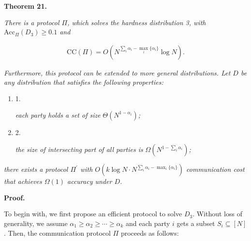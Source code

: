 

\par\medskip\noindent\textbf{
\textbf{Theorem 21}\textbf{.}
}\par



\emph{There is a protocol $\Pi$, which solves the hardness distribution 3, with $\text{Acc}_{\Pi}(D_{3})\geq 0.1$ and}\par


\[\begin{gathered}
\text{CC}(\Pi)=O(N^{\sum_{i}\alpha_{i}-\mathop{\max}_{i}\{\alpha_{i}\}}\log N).
\end{gathered}\]




\emph{Furthermore, this protocol can be extended to more general distributions. Let $D$ be any distribution that satisfies the following properties:}\par


\begin{enumerate}


\item[] 
1. 


\emph{each party holds a set of size }$\Theta(N^{1-\alpha_{i}})$\emph{;}\par





\item[] 
2. 


\emph{the size of intersecting part of all parties is }$\Omega(N^{1-\sum_{i}\alpha_{i}})$\emph{;}\par





\end{enumerate}


\emph{there exists a protocol $\Pi^{\prime}$ with $O(k\log N\cdot N^{\sum_{i}\alpha_{i}-\mathop{\max}_{i}\{\alpha_{i}\}})$ communication cost that achieves $\Omega(1)$ accuracy under $D$.}\par






\par\medskip\noindent\textbf{Proof.}\par




To begin with, we first propose an efficient protocol to solve $D_{3}$.
Without loss of generality, we assume $\alpha_{1}\geq\alpha_{2}\geq\cdots\geq\alpha_{k}$ and each party $i$ gets a subset $S_{i}\subseteq[N]$. Then, the communication protocol $\Pi$ proceeds as follows:\par


